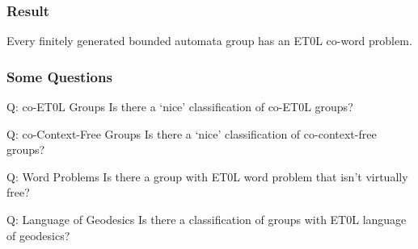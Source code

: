 \documentclass[11pt]{beamer}
\begin{document}



\begin{frame}
\frametitle{Result}

\begin{theorem}[B, Elder]
	Every finitely generated bounded automata group has an ET0L co-word problem.
\end{theorem}

\end{frame}


\begin{frame}
\frametitle{Some Questions}

\begin{block}{Q: co-ET0L Groups}
	Is there a `nice' classification of co-ET0L groups?
\end{block}

\vspace*{1em}

\begin{block}{Q: co-Context-Free Groups}
	Is there a `nice' classification of co-context-free groups?
\end{block}

\vspace*{1em}

\begin{block}{Q: Word Problems}
	Is there a group with ET0L word problem that isn't virtually free?
\end{block}

\vspace*{1em}

\begin{block}{Q: Language of Geodesics}
Is there a classification of groups with ET0L language of geodesics?
\end{block}

\end{frame}
\end{document}
